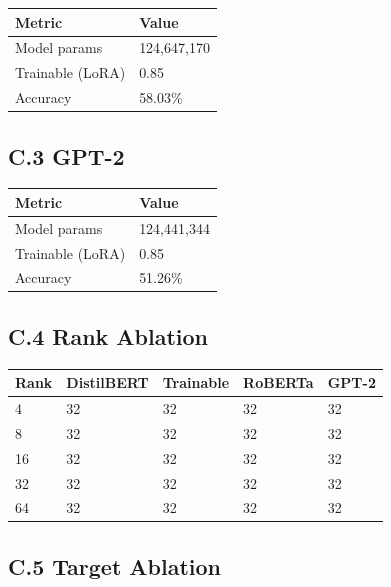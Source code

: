 \begin{table}[H]
\centering
\small
\begin{tabular}{ll}
\toprule
\textbf{Metric} & \textbf{Value} \\
\midrule
Model params & 124,647,170 \\
Trainable (LoRA) & 0.85 \\
Accuracy & 58.03\% \\
\bottomrule
\end{tabular}
\end{table}

\subsection{C.3 GPT-2}

\begin{table}[H]
\centering
\small
\begin{tabular}{ll}
\toprule
\textbf{Metric} & \textbf{Value} \\
\midrule
Model params & 124,441,344 \\
Trainable (LoRA) & 0.85 \\
Accuracy & 51.26\% \\
\bottomrule
\end{tabular}
\end{table}

\subsection{C.4 Rank Ablation}

\begin{table}[H]
\centering
\small
\begin{tabular}{lllll}
\toprule
\textbf{Rank} & \textbf{DistilBERT} & \textbf{Trainable} & \textbf{RoBERTa} & \textbf{GPT-2} \\
\midrule
4 & 32 & 32 & 32 & 32 \\
8 & 32 & 32 & 32 & 32 \\
16 & 32 & 32 & 32 & 32 \\
32 & 32 & 32 & 32 & 32 \\
64 & 32 & 32 & 32 & 32 \\
\bottomrule
\end{tabular}
\end{table}

\subsection{C.5 Target Ablation}

